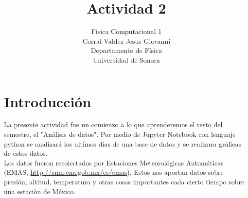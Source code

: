 \documentclass{article}
\title{Actividad 2}
\author{Fisica Computacional 1\\
Corral Valdez Jesus Giovanni\\
Departamento de Física\\
Universidad de Sonora}
\date{}
\begin{document}
\maketitle
\clearpage
\section{Introducción}
La presente actividad fue un comienzo a lo que aprenderemos el resto del semestre, el "Análisis de datos". Por medio de Jupyter Notebook con lenguaje python se analizará los ultimos días de una base de datos y se realizara gráficas de estos datos.\\
Los datos fueron recolectados por Estaciones Meteorológicas Automáticas (EMAS, \url{http://smn.cna.gob.mx/es/emas}). Estos nos aportan datos sobre presión, altitud, temperatura y otras cosas importantes cada cierto tiempo sobre una estaciòn de México.\\
\end{document}

